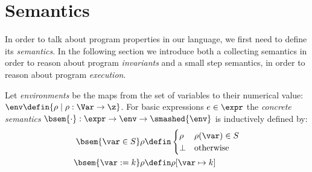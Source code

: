 \section{Semantics}

In order to talk about program properties in our language, we first
need to define its \emph{semantics}. In the following section we
introduce both a collecting semantics in order to reason about program
\emph{invariants} and a small step semantics, in order to reason about
program \emph{execution}.%

\begin{definition}
  Let \emph{environments} be the maps from the set of variables to
  their numerical value:
  \(\env \defin \{\rho \mid \rho : \Var \to \z\}\). For basic
  expressions \(e \in \expr\) the \emph{concrete semantics}
  \(\bsem{ \cdot} : \expr \to \env \to \smashed{\env}\) is
  inductively defined by:
  \begin{align*}
    \bsem{\var\in S} \rho & \defin \begin{cases} \rho & \rho(\var)\in S \\ \bot & \text{otherwise} \end{cases} \\
    \bsem{\var:= k} \rho & \defin \rho [\var\mapsto k] \\

\end{align*}
\end{definition}
